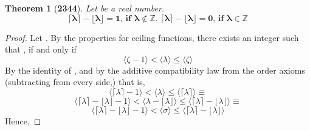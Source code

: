 \documentclass[preview]{standalone}
\newtheorem{theorem}{Theorem}
\begin{document}
\begin{theorem}[\textbf{2344}]
    Let \bm{$\lambda$} be a real number.
    \begin{equation*}
        \bm{\lceil \lambda \rceil 
            - 
        \lfloor \lambda \rfloor 
            = 
        1
            \textbf{, if }
        \lambda \notin \mathbb{Z} 
            \textbf{. }
        \lceil \lambda \rceil
            - 
        \lfloor \lambda \rfloor 
            = 
        0
            \textbf{, if }
        \lambda \in \mathbb{Z}}
    \end{equation*} 
\end{theorem}

\begin{proof}
    Let \bm{$\lambda - \lfloor \lambda \rfloor = \sigma$}.
    By the properties for ceiling functions,
    there exists an integer \bm{$\zeta$} such that
    \bm{$\lceil \lambda \rceil = \zeta$}, 
    if and only if
    \begin{equation*}
        \Big \langle \zeta - 1 \Big \rangle
            < 
        \Big \langle \lambda \Big \rangle
            \leq 
        \Big \langle \zeta \Big \rangle
    \end{equation*}
    By the identity of \bm{$\zeta$}, 
    and by the additive compatibility law from the order axioms
    (subtracting \bm{$\lfloor \lambda \rfloor$} from every side,)
    that is,
    \begin{equation*}
        \Big \langle \lceil \lambda \rceil - 1 \Big \rangle 
            <
        \Big \langle \lambda \Big \rangle
            \leq 
        \Big \langle \lceil \lambda \rceil \Big \rangle
            \equiv
    \end{equation*}
    \begin{equation*}
        \Big \langle \lceil \lambda \rceil - \lfloor \lambda \rfloor - 1 \Big \rangle
            < 
        \Big \langle \lambda - \lfloor \lambda \rfloor \Big \rangle
            \leq 
        \Big \langle \lceil \lambda \rceil - \lfloor \lambda \rfloor \Big \rangle
            \equiv
    \end{equation*}
    \begin{equation*}
        \Big \langle \lceil \lambda \rceil - \lfloor \lambda \rfloor - 1 \Big \rangle
            < 
        \Big \langle \sigma \Big \rangle
            \leq 
        \Big \langle \lceil \lambda \rceil - \lfloor \lambda \rfloor \Big \rangle
    \end{equation*}
    Hence, 
    \bm{$
        \lceil \sigma \rceil 
            = 
        \lceil \lambda \rceil - \lfloor \lambda \rceil
}
\end{proof}
\end{document}
